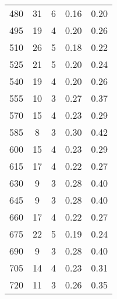 \begin{table}
\begin{tabular}{S S S S S }
480  & 31  & 6  & 0.16  & 0.20\\ 
495  & 19  & 4  & 0.20  & 0.26\\ 
510  & 26  & 5  & 0.18  & 0.22\\ 
525  & 21  & 5  & 0.20  & 0.24\\ 
540  & 19  & 4  & 0.20  & 0.26\\ 
555  & 10  & 3  & 0.27  & 0.37\\ 
570  & 15  & 4  & 0.23  & 0.29\\ 
585  & 8  & 3  & 0.30  & 0.42\\ 
600  & 15  & 4  & 0.23  & 0.29\\ 
615  & 17  & 4  & 0.22  & 0.27\\ 
630  & 9  & 3  & 0.28  & 0.40\\ 
645  & 9  & 3  & 0.28  & 0.40\\ 
660  & 17  & 4  & 0.22  & 0.27\\ 
675  & 22  & 5  & 0.19  & 0.24\\ 
690  & 9  & 3  & 0.28  & 0.40\\ 
705  & 14  & 4  & 0.23  & 0.31\\ 
720  & 11  & 3  & 0.26  & 0.35\\ 
\bottomrule 
\end{tabular} 
\end{table}